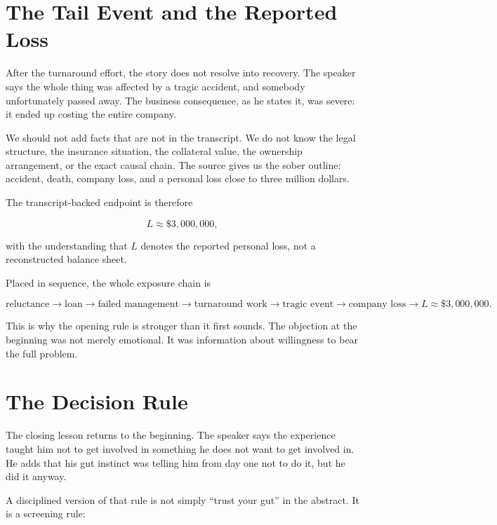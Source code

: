 \section{The Tail Event and the Reported Loss}

After the turnaround effort, the story does not resolve into recovery. The speaker says the whole thing was affected by a tragic accident, and somebody unfortunately passed away. The business consequence, as he states it, was severe: it ended up costing the entire company.

We should not add facts that are not in the transcript. We do not know the legal structure, the insurance situation, the collateral value, the ownership arrangement, or the exact causal chain. The source gives us the sober outline: accident, death, company loss, and a personal loss close to three million dollars.

The transcript-backed endpoint is therefore

\begin{equation}
L \approx \$3{,}000{,}000,
\end{equation}

with the understanding that \(L\) denotes the reported personal loss, not a reconstructed balance sheet.

Placed in sequence, the whole exposure chain is

\begin{equation}
\text{reluctance}
\to
\text{loan}
\to
\text{failed management}
\to
\text{turnaround work}
\to
\text{tragic event}
\to
\text{company loss}
\to
L \approx \$3{,}000{,}000.
\end{equation}

This is why the opening rule is stronger than it first sounds. The objection at the beginning was not merely emotional. It was information about willingness to bear the full problem.

\section{The Decision Rule}

The closing lesson returns to the beginning. The speaker says the experience taught him not to get involved in something he does not want to get involved in. He adds that his gut instinct was telling him from day one not to do it, but he did it anyway.

A disciplined version of that rule is not simply ``trust your gut'' in the abstract. It is a screening rule:


